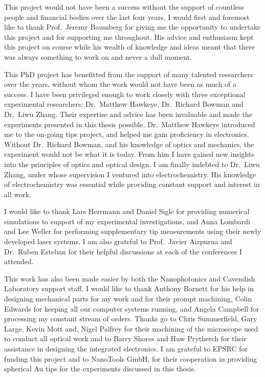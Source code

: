 \documentclass[12pt, a4paper, oneside]{book}
\begin{document}
This project would not have been a success without the support of countless people and financial bodies over the last four years.
I would first and foremost like to thank Prof.\ Jeremy Baumberg for giving me the opportunity to undertake this project and for supporting me throughout. His advice and enthusiasm kept this project on course while his wealth of knowledge and ideas meant that there was always something to work on and never a dull moment.

This PhD project has benefitted from the support of many talented researchers over the years, without whom the work would not have been as much of a success. I have been privileged enough to work closely with three exceptional experimental researchers: Dr.\ Matthew Hawkeye, Dr.\ Richard Bowman and Dr.\ Liwu Zhang. Their expertise and advice has been invaluable and made the experiments presented in this thesis possible. Dr.\ Matthew Hawkeye introduced me to the on-going tips project, and helped me gain proficiency in electronics. Without Dr.\ Richard Bowman, and his knowledge of optics and mechanics, the experiment would not be what it is today. From him I have gained new insights into the principles of optics and optical design. I am finally indebted to Dr.\ Liwu Zhang, under whose supervision I ventured into electrochemistry. His knowledge of electrochemistry was essential while providing constant support and interest in all work.

I would like to thank Lars Herrmann and Daniel Sigle for providing numerical simulations to support of my experimental investigations, and Anna Lombardi and Lee Weller for performing supplementary tip measurements using their newly developed laser systems. I am also grateful to Prof.\ Javier Aizpurua and Dr.\ Ruben Esteban for their helpful discussions at each of the conferences I attended.

This work has also been made easier by both the Nanophotonics and Cavendish Laboratory support staff. I would like to thank Anthony Barnett for his help in designing mechanical parts for my work and for their prompt machining, Colin Edwards for keeping all our computer systems running, and Angela Campbell for processing my constant stream of orders. Thanks go to Chris Summerfield, Gary Large, Kevin Mott and, Nigel Palfrey for their machining of the microscope used to conduct all optical work and to Barry Shores and Huw Prytherch for their assistance in designing the integrated electronics. I am grateful to EPSRC for funding this project and to NanoTools GmbH, for their cooperation in providing spherical Au tips for the experiments discussed in this thesis.
\end{document}
